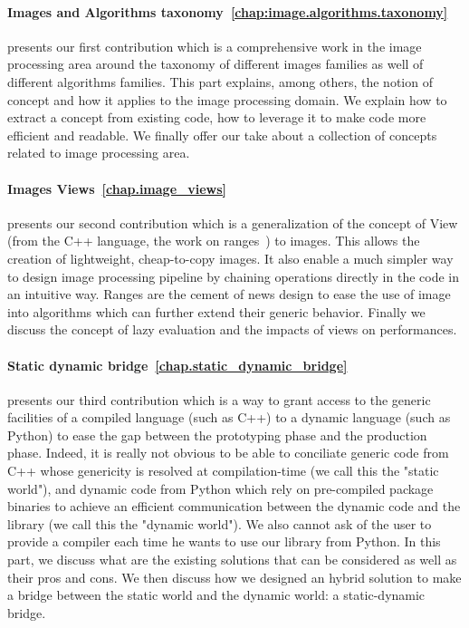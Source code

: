 \paragraph{Images and Algorithms taxonomy~\ref{chap:image.algorithms.taxonomy}} presents our first contribution
which is a comprehensive work in the image processing area around the taxonomy of different images families as well of
different algorithms families. This part explains, among others, the notion of concept and how it applies to the image
processing domain. We explain how to extract a concept from existing code, how to leverage it to make code more
efficient and readable. We finally offer our take about a collection of concepts related to image processing area.

\paragraph{Images Views~\ref{chap.image_views}} presents our second contribution which is a generalization of the
concept of View (from the C++ language, the work on ranges~\parencite{niebler.2018.ranges}) to images. This allows the
creation of lightweight, cheap-to-copy images. It also enable a much simpler way to design image processing pipeline by
chaining operations directly in the code in an intuitive way. Ranges are the cement of news design to ease the use of
image into algorithms which can further extend their generic behavior. Finally we discuss the concept of lazy evaluation
and the impacts of views on performances.

\paragraph{Static dynamic bridge~\ref{chap.static_dynamic_bridge}} presents our third contribution which is a way to
grant access to the generic facilities of a compiled language (such as C++) to a dynamic language (such as Python) to
ease the gap between the prototyping phase and the production phase. Indeed, it is really not obvious to be able to
conciliate generic code from C++ whose genericity is resolved at compilation-time (we call this the "static world"), and
dynamic code from Python which rely on pre-compiled package binaries to achieve an efficient communication between the
dynamic code and the library (we call this the "dynamic world"). We also cannot ask of the user to provide a compiler
each time he wants to use our library from Python. In this part, we discuss what are the existing solutions that can be
considered as well as their pros and cons. We then discuss how we designed an hybrid solution to make a bridge between
the static world and the dynamic world: a static-dynamic bridge.
